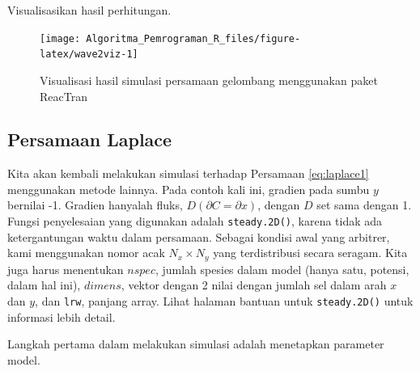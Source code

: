 \documentclass[
]{book}
\newenvironment{Shaded}{\begin{snugshade}}{\end{snugshade}}
\newcommand{\AttributeTok}[1]{\textcolor[rgb]{0.13,0.29,0.53}{#1}}
\newcommand{\DecValTok}[1]{\textcolor[rgb]{0.00,0.00,0.81}{#1}}
\newcommand{\FunctionTok}[1]{\textcolor[rgb]{0.13,0.29,0.53}{\textbf{#1}}}
\newcommand{\NormalTok}[1]{#1}
\newcommand{\OtherTok}[1]{\textcolor[rgb]{0.56,0.35,0.01}{#1}}
\newcommand{\SpecialCharTok}[1]{\textcolor[rgb]{0.81,0.36,0.00}{\textbf{#1}}}
\theoremstyle{definition}
\theoremstyle{definition}
\theoremstyle{definition}
\theoremstyle{definition}
\theoremstyle{remark}
\begin{document}
Visualisasikan hasil perhitungan.

\begin{figure}

{\centering \texttt{[image: Algoritma\_Pemrograman\_R\_files/figure-latex/wave2viz-1]} 

}

\caption{Visualisasi hasil simulasi persamaan gelombang menggunakan paket ReacTran}\label{fig:wave2viz}
\end{figure}

\hypertarget{persamaan-laplace}{%
\subsection{Persamaan Laplace}\label{persamaan-laplace}}

Kita akan kembali melakukan simulasi terhadap Persamaan \eqref{eq:laplace1} menggunakan metode lainnya. Pada contoh kali ini, gradien pada sumbu \(y\) bernilai -1. Gradien hanyalah fluks, \(D \left(\partial C = \partial x\right)\), dengan \(D\) set sama dengan 1. Fungsi penyelesaian yang digunakan adalah \texttt{steady.2D()}, karena tidak ada ketergantungan waktu dalam persamaan. Sebagai kondisi awal yang arbitrer, kami menggunakan nomor acak \(N_x \times N_y\) yang terdistribusi secara seragam. Kita juga harus menentukan \(nspec\), jumlah spesies dalam model (hanya satu, potensi, dalam hal ini), \(dimens\), vektor dengan 2 nilai dengan jumlah sel dalam arah \(x\) dan \(y\), dan \texttt{lrw}, panjang array. Lihat halaman bantuan untuk \texttt{steady.2D()} untuk informasi lebih detail.

Langkah pertama dalam melakukan simulasi adalah menetapkan parameter model.

\begin{Shaded}
\end{Shaded}
\end{document}
